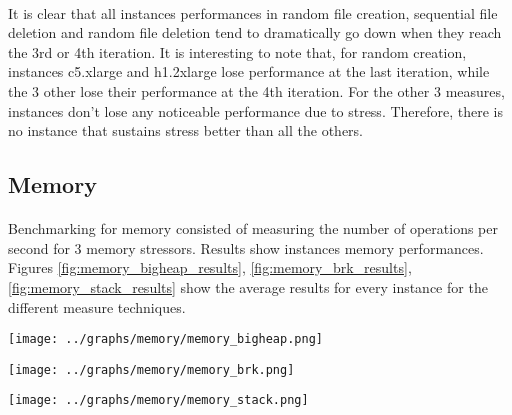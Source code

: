 \documentclass[11pt]{article}
\begin{document}
		\paragraph{} It is clear that all instances performances in random file
		creation, sequential file deletion and random file deletion tend to
		dramatically go down when they reach the 3rd or 4th iteration. It is
		interesting to note that, for random creation, instances c5.xlarge and
		h1.2xlarge lose performance at the last iteration, while the 3 other
		lose their performance at the 4th iteration. For the other 3 measures,
		instances don’t lose any noticeable performance due to stress.
		Therefore, there is no instance that sustains stress better than all the
		others. \pagebreak

	\subsection{Memory}
		\paragraph{} Benchmarking for memory consisted of measuring the number
		of operations per second for 3 memory stressors. Results show instances
		memory performances. Figures \ref{fig:memory_bigheap_results}, \ref{fig:memory_brk_results},
		\ref{fig:memory_stack_results} show the average results for every instance
		for the different measure techniques.

		\begin{center}
		\begin{minipage}{0.6\textwidth}
			 \label{fig:memory_bigheap_results}
			\texttt{[image: ../graphs/memory/memory\_bigheap.png]}
		\end{minipage}

		\begin{minipage}{0.6\textwidth}
			 \label{fig:memory_brk_results}
			\texttt{[image: ../graphs/memory/memory\_brk.png]}
		\end{minipage}

		\begin{minipage}{0.6\textwidth}
			 \label{fig:memory_stack_results}
			\texttt{[image: ../graphs/memory/memory\_stack.png]}
		\end{minipage}
		\end{center}
\end{document}
